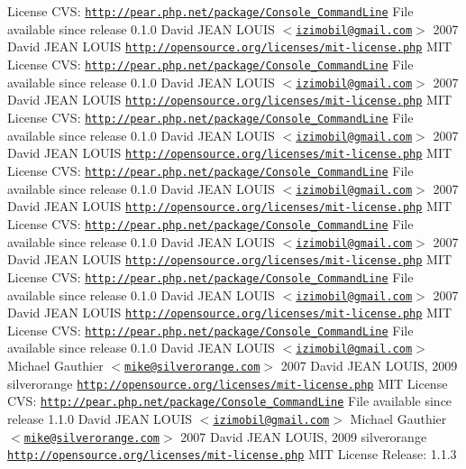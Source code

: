 License  CVS:   \href{http://pear.php.net/package/Console_CommandLine}{\tt http://pear.php.net/package/Console\_\-CommandLine}  File available since release 0.1.0    David JEAN LOUIS $<$\href{mailto:izimobil@gmail.com}{\tt izimobil@gmail.com}$>$  2007 David JEAN LOUIS  \href{http://opensource.org/licenses/mit-license.php}{\tt http://opensource.org/licenses/mit-\/license.php} MIT License  CVS:   \href{http://pear.php.net/package/Console_CommandLine}{\tt http://pear.php.net/package/Console\_\-CommandLine}  File available since release 0.1.0    David JEAN LOUIS $<$\href{mailto:izimobil@gmail.com}{\tt izimobil@gmail.com}$>$  2007 David JEAN LOUIS  \href{http://opensource.org/licenses/mit-license.php}{\tt http://opensource.org/licenses/mit-\/license.php} MIT License  CVS:   \href{http://pear.php.net/package/Console_CommandLine}{\tt http://pear.php.net/package/Console\_\-CommandLine}  File available since release 0.1.0    David JEAN LOUIS $<$\href{mailto:izimobil@gmail.com}{\tt izimobil@gmail.com}$>$  2007 David JEAN LOUIS  \href{http://opensource.org/licenses/mit-license.php}{\tt http://opensource.org/licenses/mit-\/license.php} MIT License  CVS:   \href{http://pear.php.net/package/Console_CommandLine}{\tt http://pear.php.net/package/Console\_\-CommandLine}  File available since release 0.1.0    David JEAN LOUIS $<$\href{mailto:izimobil@gmail.com}{\tt izimobil@gmail.com}$>$  2007 David JEAN LOUIS  \href{http://opensource.org/licenses/mit-license.php}{\tt http://opensource.org/licenses/mit-\/license.php} MIT License  CVS:   \href{http://pear.php.net/package/Console_CommandLine}{\tt http://pear.php.net/package/Console\_\-CommandLine}  File available since release 0.1.0    David JEAN LOUIS $<$\href{mailto:izimobil@gmail.com}{\tt izimobil@gmail.com}$>$  2007 David JEAN LOUIS  \href{http://opensource.org/licenses/mit-license.php}{\tt http://opensource.org/licenses/mit-\/license.php} MIT License  CVS:   \href{http://pear.php.net/package/Console_CommandLine}{\tt http://pear.php.net/package/Console\_\-CommandLine}  File available since release 0.1.0    David JEAN LOUIS $<$\href{mailto:izimobil@gmail.com}{\tt izimobil@gmail.com}$>$  2007 David JEAN LOUIS  \href{http://opensource.org/licenses/mit-license.php}{\tt http://opensource.org/licenses/mit-\/license.php} MIT License  CVS:   \href{http://pear.php.net/package/Console_CommandLine}{\tt http://pear.php.net/package/Console\_\-CommandLine}  File available since release 0.1.0    David JEAN LOUIS $<$\href{mailto:izimobil@gmail.com}{\tt izimobil@gmail.com}$>$  Michael Gauthier $<$\href{mailto:mike@silverorange.com}{\tt mike@silverorange.com}$>$  2007 David JEAN LOUIS, 2009 silverorange  \href{http://opensource.org/licenses/mit-license.php}{\tt http://opensource.org/licenses/mit-\/license.php} MIT License  CVS:   \href{http://pear.php.net/package/Console_CommandLine}{\tt http://pear.php.net/package/Console\_\-CommandLine}  File available since release 1.1.0    David JEAN LOUIS $<$\href{mailto:izimobil@gmail.com}{\tt izimobil@gmail.com}$>$  Michael Gauthier $<$\href{mailto:mike@silverorange.com}{\tt mike@silverorange.com}$>$  2007 David JEAN LOUIS, 2009 silverorange  \href{http://opensource.org/licenses/mit-license.php}{\tt http://opensource.org/licenses/mit-\/license.php} MIT License  Release: 1.1.3  